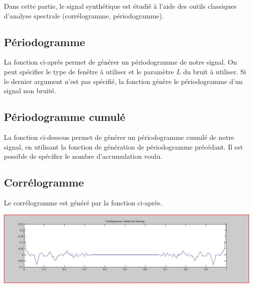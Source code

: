 \documentclass[a4paper,11pt]{article}
\newcommand{\FSource}[1]{%
  
  }
\begin{document}
Dans cette partie, le signal synthétique est étudié à l'aide des outils classiques d'analyse spectrale (corrélogramme, périodogramme).

\subsection{Périodogramme}

La fonction ci-après permet de générer un périodogramme de notre signal. On peut
spécifier le type de fenêtre à utiliser et le paramètre $L$ du bruit à utiliser.
Si le dernier argument n'est pas spécifié, la fonction génère le périodogramme
d'un signal non bruité.

\vspace{0.5cm}

\FSource{matlab/3.m}

\vspace{0.5cm}

\subsection{Périodogramme cumulé}

La fonction ci-dessous permet de générer un périodogramme cumulé de notre
signal, en utilisant la fonction de génération de périodogramme précédant. Il
est possible de spécifier le nombre d'accumulation voulu.

\vspace{0.5cm}

\FSource{matlab/4.m}

\vspace{0.5cm}

\subsection{Corrélogramme}

Le corrélogramme est généré par la fonction ci-après.

\FSource{matlab/5.m}

\vspace{0.5cm}

\includegraphics[width=15cm]{capture/correlo.JPG}
\end{document}
